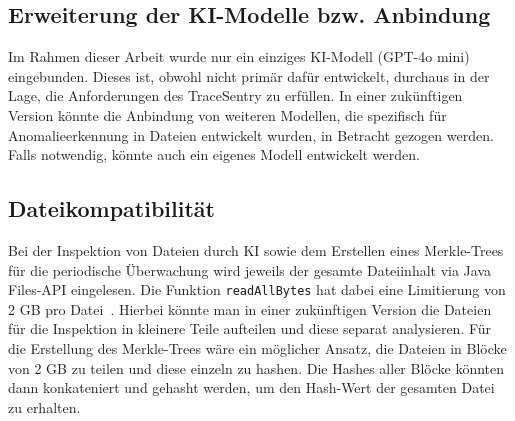 \documentclass[a4paper,12pt]{report}
\begin{document}
    \subsection{Erweiterung der KI-Modelle bzw. Anbindung}\label{subsec:erweiterung-der-ki-modelle}
    Im Rahmen dieser Arbeit wurde nur ein einziges KI-Modell (GPT-4o mini) eingebunden.
    Dieses ist, obwohl nicht primär dafür entwickelt, durchaus in der Lage, die Anforderungen des TraceSentry zu erfüllen.
    In einer zukünftigen Version könnte die Anbindung von weiteren Modellen, die spezifisch für Anomalieerkennung in Dateien entwickelt wurden, in Betracht gezogen werden.
    Falls notwendig, könnte auch ein eigenes Modell entwickelt werden.

    \subsection{Dateikompatibilität}\label{subsec:dateikompatibilitat}
    Bei der Inspektion von Dateien durch KI sowie dem Erstellen eines Merkle-Trees für die periodische Überwachung wird jeweils der gesamte Dateiinhalt via Java Files-API eingelesen.
    Die Funktion \texttt{readAllBytes} hat dabei eine Limitierung von 2 GB pro Datei~\cite{javaAPI}.
    Hierbei könnte man in einer zukünftigen Version die Dateien für die Inspektion in kleinere Teile aufteilen und diese separat analysieren.
    Für die Erstellung des Merkle-Trees wäre ein möglicher Ansatz, die Dateien in Blöcke von 2 GB zu teilen und diese einzeln zu hashen.
    Die Hashes aller Blöcke könnten dann konkateniert und gehasht werden, um den Hash-Wert der gesamten Datei zu erhalten.

    \printglossary

    \clearpage
    \printindex
\end{document}
